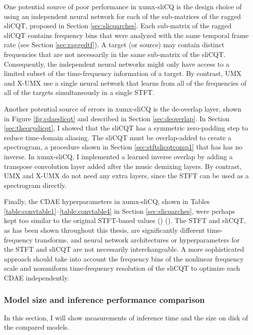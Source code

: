 \documentclass[report.tex]{subfiles}
\begin{document}
One potential source of poor performance in xumx-sliCQ is the design choice of using an independent neural network for each of the sub-matrices of the ragged sliCQT, proposed in Section \ref{sec:slicqarches}. Each sub-matrix of the ragged sliCQT contains frequency bins that were analyzed with the same temporal frame rate (see Section \ref{sec:raggedtf}). A target (or source) may contain distinct frequencies that are not necessarily in the same sub-matrix of the sliCQT. Consequently, the independent neural networks might only have access to a limited subset of the time-frequency information of a target. By contrast, UMX and X-UMX use a single neural network that learns from all of the frequencies of all of the targets simultaneously in a single STFT.

Another potential source of errors in xumx-sliCQ is the de-overlap layer, shown in Figure \ref{fig:cdaeslicqt} and described in Section \ref{sec:deoverlap}. In Section \ref{sec:theoryslicqt}, I showed that the sliCQT has a symmetric zero-padding step to reduce time-domain aliasing. The sliCQT must be overlap-added to create a spectrogram, a procedure shown in Section \ref{sec:stftslicqtcomp1} that has has no inverse. In xumx-sliCQ, I implemented a learned inverse overlap by adding a transpose convolution layer added after the music demixing layers. By contrast, UMX and X-UMX do not need any extra layers, since the STFT can be used as a spectrogram directly.

Finally, the CDAE hyperparameters in xumx-sliCQ, shown in Tables \ref{table:convtable1}--\ref{table:convtable4} in Section \ref{sec:slicqarches}, were perhaps kept too similar to the original STFT-based values (\cite[3]{plumbley1}) (\cite[3]{plumbley2}). The STFT and sliCQT, as has been shown throughout this thesis, are significantly different time-frequency transforms, and neural network architectures or hyperparameters for the STFT and sliCQT are not necessarily interchangeable. A more sophisticated approach should take into account the frequency bins of the nonlinear frequency scale and nonuniform time-frequency resolution of the sliCQT to optimize each CDAE independently.

\newpagefill

\subsubsection{Model size and inference performance comparison}
\label{sec:inferenceperf}

In this section, I will show measurements of inference time and the size on disk of the compared models.
\end{document}
